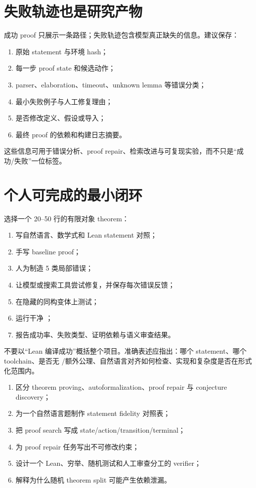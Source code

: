 \section{失败轨迹也是研究产物}

成功 proof 只展示一条路径；失败轨迹包含模型真正缺失的信息。建议保存：
\begin{enumerate}
  \item 原始 statement 与环境 hash；
  \item 每一步 proof state 和候选动作；
  \item parser、elaboration、timeout、unknown lemma 等错误分类；
  \item 最小失败例子与人工修复理由；
  \item 是否修改定义、假设或导入；
  \item 最终 proof 的依赖和构建日志摘要。
\end{enumerate}
这些信息可用于错误分析、proof repair、检索改进与可复现实验，而不只是“成功/失败”一位标签。

\section{个人可完成的最小闭环}

选择一个 20--50 行的有限对象 theorem：
\begin{enumerate}
  \item 写自然语言、数学式和 Lean statement 对照；
  \item 手写 baseline proof；
  \item 人为制造 5 类局部错误；
  \item 让模型或搜索工具尝试修复，并保存每次错误反馈；
  \item 在隐藏的同构变体上测试；
  \item 运行干净 ；
  \item 报告成功率、失败类型、证明依赖与语义审查结果。
\end{enumerate}

\begin{warningbox}
不要以“Lean 编译成功”概括整个项目。准确表述应指出：哪个 statement、哪个 toolchain、是否无 /额外公理、自然语言对齐如何检查、实现和复杂度是否在形式化范围内。
\end{warningbox}

\begin{checkpointbox}
\begin{enumerate}
  \item 区分 theorem proving、autoformalization、proof repair 与 conjecture discovery；
  \item 为一个自然语言题制作 statement fidelity 对照表；
  \item 把 proof search 写成 state/action/transition/terminal；
  \item 为 proof repair 任务写出不可修改约束；
  \item 设计一个 Lean、穷举、随机测试和人工审查分工的 verifier；
  \item 解释为什么随机 theorem split 可能产生依赖泄漏。
\end{enumerate}
\end{checkpointbox}

